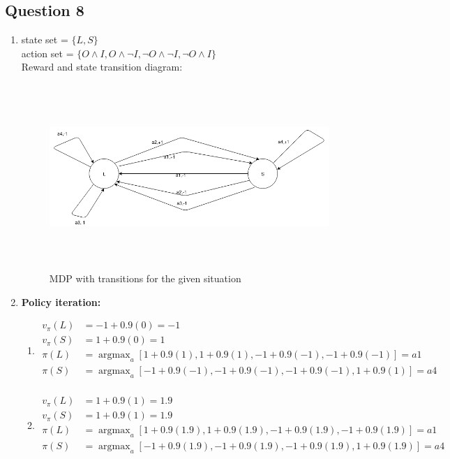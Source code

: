 \documentclass[12pt]{extarticle}
\DeclareMathOperator*{\argmax}{argmax} %
\begin{document}
\subsection{Question 8}
\begin{enumerate}[label=(\alph*)]
\item 
state set = $\{L, S\}$\\
action set = $\{O\land I, O\land \neg I, \neg O\land \neg I, \neg O\land I\}$\\
Reward and state transition diagram:
\begin{figure}[H]
		\includegraphics[width=\textwidth, height=7cm]{trans.png}
		\caption{MDP with transitions for the given situation}
		\label{fig:trans}
	\end{figure}

\item 
\textbf{Policy iteration:}\\
	\begin{enumerate}[label=\arabic*)]
	\item 
	\begin{align*}
	v_{\pi}(L) & = -1 + 0.9(0) = -1 \\
	v_{\pi}(S) & = 1 + 0.9(0) = 1 \\
	\pi(L) & = \argmax_a[{1+0.9(1),1+0.9(1),-1+0.9(-1),-1+0.9(-1)}] = a1 \\
	\pi(S) & = \argmax_a[{-1+0.9(-1),-1+0.9(-1),-1+0.9(-1),1+0.9(1)}] = a4 \\
	\end{align*}
	
	\item 
	\begin{align*}
	v_{\pi}(L) & = 1 + 0.9(1) = 1.9 \\
	v_{\pi}(S) & = 1 + 0.9(1) = 1.9 \\
	\pi(L) & = \argmax_a[{1+0.9(1.9),1+0.9(1.9),-1+0.9(1.9),-1+0.9(1.9)}] = a1 \\
	\pi(S) & = \argmax_a[{-1+0.9(1.9),-1+0.9(1.9),-1+0.9(1.9),1+0.9(1.9)}] = a4 \\
	\end{align*}
	\end{enumerate}


\end{enumerate}
\end{document}
